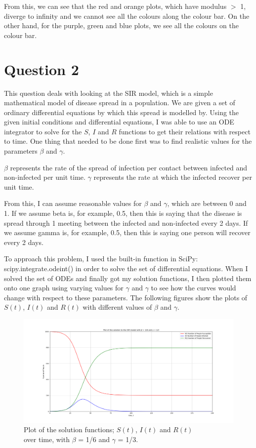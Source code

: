 \documentclass{article}
\begin{document}
From this, we can see that the red and orange plots, which have modulus $>$ 1, diverge to infinity and we cannot see all the colours along the colour bar. On the other hand, for the purple, green and blue plots, we see all the colours on the colour bar.


\section*{Question 2}

This question deals with looking at the SIR model, which is a simple mathematical model of disease spread in a population. 
We are given a set of ordinary differential equations by which this spread is modelled by. 
Using the given initial conditions and differential equations, I was able to use an ODE integrator to solve for the $S$, $I$ and $R$ functions to get their relations with respect to time.
One thing that needed to be done first was to find realistic values for the parameters $\beta$ and $\gamma$. 

$\beta$ represents the rate of the spread of infection per contact between infected and non-infected per unit time.
$\gamma$ represents the rate at which the infected recover per unit time.

From this, I can assume reasonable values for $\beta$ and $\gamma$, which are between 0 and 1. 
If we assume beta is, for example, 0.5, then this is saying that the disease is spread through 1 meeting between the infected and non-infected every 2 days. 
If we assume gamma is, for example, 0.5, then this is saying one person will recover every 2 days.

\bigskip
To approach this problem, I used the built-in function in SciPy: scipy.integrate.odeint() in order to solve the set of differential equations.
When I solved the set of ODEs and finally got my solution functions, I then plotted them onto one graph using varying values for $\gamma$ and $\gamma$ to see how the curves would change with respect to these parameters.
The following figures show the plots of $S(t)$, $I(t)$ and $R(t)$ with different values of $\beta$ and $\gamma$.

\begin{figure}[!ht]
  \centering
  \includegraphics[width=1\linewidth]{Q2_plot1.png}
  \caption{Plot of the solution functions; $S(t)$, $I(t)$ and $R(t)$ \\ over time, with $\beta$ = 1/6 and $\gamma$ = 1/3.}
  \label{fig:Q2_plot1.png}
\end{figure}
\end{document}
